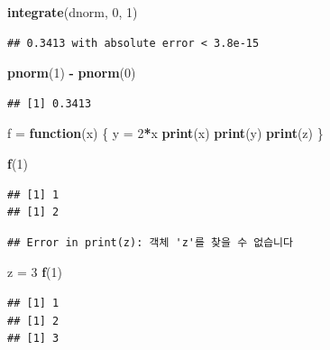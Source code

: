 \documentclass[10pt,]{krantz}
\makeatletter
\newenvironment{Shaded}{\begin{snugshade}}{\end{snugshade}}
\newcommand{\KeywordTok}[1]{\textcolor[rgb]{0.13,0.29,0.53}{\textbf{#1}}}
\newcommand{\DecValTok}[1]{\textcolor[rgb]{0.00,0.00,0.81}{#1}}
\newcommand{\StringTok}[1]{\textcolor[rgb]{0.31,0.60,0.02}{#1}}
\newcommand{\ControlFlowTok}[1]{\textcolor[rgb]{0.13,0.29,0.53}{\textbf{#1}}}
\newcommand{\OperatorTok}[1]{\textcolor[rgb]{0.81,0.36,0.00}{\textbf{#1}}}
\newcommand{\NormalTok}[1]{#1}
\newenvironment{kframe}{%
\medskip{}
\setlength{\fboxsep}{.8em}
 \def\at@end@of@kframe{}%
 \ifinner\ifhmode%
  \def\at@end@of@kframe{\end{minipage}}%
  \begin{minipage}{\columnwidth}%
 \fi\fi%
 \def\FrameCommand##1{\hskip\@totalleftmargin \hskip-\fboxsep
 \colorbox{shadecolor}{##1}\hskip-\fboxsep
     \hskip-\linewidth \hskip-\@totalleftmargin \hskip\columnwidth}%
 \MakeFramed {\advance\hsize-\width
   \@totalleftmargin\z@ \linewidth\hsize
   \@setminipage}}%
 {\par\unskip\endMakeFramed%
 \at@end@of@kframe}
\renewenvironment{Shaded}{\begin{kframe}}{\end{kframe}}
\makeatother
\begin{document}
\begin{Shaded}
\begin{Highlighting}[]
\KeywordTok{integrate}\NormalTok{(dnorm, }\DecValTok{0}\NormalTok{, }\DecValTok{1}\NormalTok{)}
\end{Highlighting}
\end{Shaded}

\begin{verbatim}
## 0.3413 with absolute error < 3.8e-15
\end{verbatim}

\begin{Shaded}
\begin{Highlighting}[]
\KeywordTok{pnorm}\NormalTok{(}\DecValTok{1}\NormalTok{) }\OperatorTok{-}\StringTok{ }\KeywordTok{pnorm}\NormalTok{(}\DecValTok{0}\NormalTok{)}
\end{Highlighting}
\end{Shaded}

\begin{verbatim}
## [1] 0.3413
\end{verbatim}

\begin{Shaded}
\begin{Highlighting}[]
\NormalTok{f =}\StringTok{ }\ControlFlowTok{function}\NormalTok{(x) }
\NormalTok{\{}
\NormalTok{  y =}\StringTok{ }\DecValTok{2}\OperatorTok{*}\NormalTok{x}
  \KeywordTok{print}\NormalTok{(x)}
  \KeywordTok{print}\NormalTok{(y)}
  \KeywordTok{print}\NormalTok{(z)}
\NormalTok{\}}

\KeywordTok{f}\NormalTok{(}\DecValTok{1}\NormalTok{)}
\end{Highlighting}
\end{Shaded}

\begin{verbatim}
## [1] 1
## [1] 2
\end{verbatim}

\begin{verbatim}
## Error in print(z): 객체 'z'를 찾을 수 없습니다
\end{verbatim}

\begin{Shaded}
\begin{Highlighting}[]
\NormalTok{z =}\StringTok{ }\DecValTok{3}
\KeywordTok{f}\NormalTok{(}\DecValTok{1}\NormalTok{)}
\end{Highlighting}
\end{Shaded}

\begin{verbatim}
## [1] 1
## [1] 2
## [1] 3
\end{verbatim}
\end{document}

